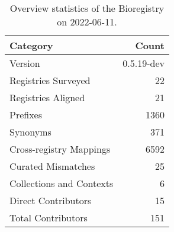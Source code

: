 \begin{table}
\centering
\caption{Overview statistics of the Bioregistry on 2022-06-11.}
\label{tab:bioregistry-summary}
\begin{tabular}{lr}
\toprule
                Category &      Count \\
\midrule
                 Version & 0.5.19-dev \\
     Registries Surveyed &         22 \\
      Registries Aligned &         21 \\
                Prefixes &       1360 \\
                Synonyms &        371 \\
 Cross-registry Mappings &       6592 \\
      Curated Mismatches &         25 \\
Collections and Contexts &          6 \\
     Direct Contributors &         15 \\
      Total Contributors &        151 \\
\bottomrule
\end{tabular}
\end{table}
